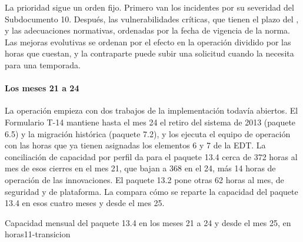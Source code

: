 La prioridad sigue un orden fijo. Primero van los incidentes por su severidad del Subdocumento 10.
Después, las vulnerabilidades críticas, que tienen el plazo del , y las adecuaciones
normativas, ordenadas por la fecha de vigencia de la norma. Las mejoras evolutivas se ordenan por el
efecto en la operación dividido por las horas que cuestan, y la contraparte puede subir una solicitud
cuando la necesita para una temporada.

\paragraph{Los meses 21 a 24} La operación empieza con dos trabajos de la implementación todavía
abiertos. El Formulario T-14 mantiene hasta el mes 24 el retiro del sistema de 2013 (paquete 6.5) y la
migración histórica (paquete 7.2), y los ejecuta el equipo de operación con las horas que ya tienen
asignadas los elementos 6 y 7 de la EDT. La conciliación de capacidad por perfil da para el paquete 13.4
cerca de 372 horas al mes de esos cierres en el mes 21, que bajan a 368 en el 24, más 14 horas de
operación de las innovaciones. El paquete 13.2 pone otras 62 horas al mes, de seguridad y de plataforma.
La  compara cómo se reparte la capacidad del paquete 13.4 en esos cuatro meses y
desde el mes 25.

\begin{figuraNativa}[!ht]{Capacidad mensual del paquete 13.4 en los meses 21 a 24 y desde el mes 25, en horas}{11-transicion}
\end{figuraNativa}

